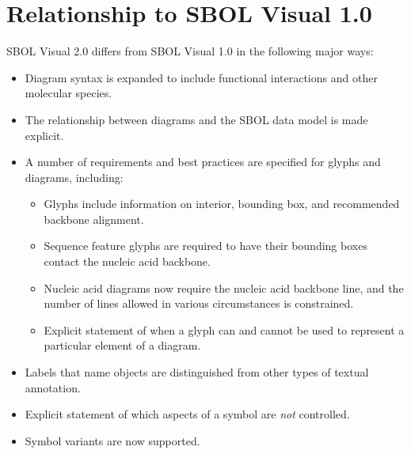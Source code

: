 \section{Relationship to SBOL Visual 1.0}\label{sec:sbol1}

SBOL Visual 2.0 differs from SBOL Visual 1.0 in the following major ways:
\begin{itemize}
\item Diagram syntax is expanded to include functional interactions and other molecular species.
\item The relationship between diagrams and the SBOL data model is made explicit.
\item A number of requirements and best practices are specified for glyphs and diagrams, including:
	\begin{itemize}
	\item Glyphs include information on interior, bounding box, and recommended backbone alignment.
	\item Sequence feature glyphs are required to have their bounding boxes contact the nucleic acid backbone.
	\item Nucleic acid diagrams now require the nucleic acid backbone line, and the number of lines allowed in various circumstances is constrained.
	\item Explicit statement of when a glyph can and cannot be used to represent a particular element of a diagram.
	\end{itemize}
\item Labels that name objects are distinguished from other types of textual annotation.
\item Explicit statement of which aspects of a symbol are {\em not} controlled.
\item Symbol variants are now supported.
\end{itemize}

